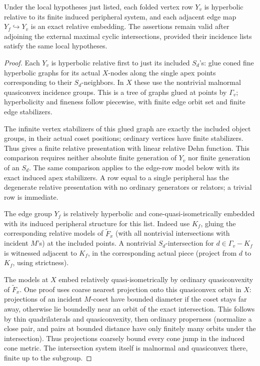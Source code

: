 \begin{lemma}\label{transfer:relative-rows}
Under the local hypotheses just listed, each folded vertex row \(Y_v\) is hyperbolic relative to its finite induced peripheral system, and each adjacent edge map \(Y_f\hookrightarrow Y_v\) is an exact relative embedding. The assertions remain valid after adjoining the external maximal cyclic intersections, provided their incidence lists satisfy the same local hypotheses.
\end{lemma}
\begin{proof}
Each \(Y_v\) is hyperbolic relative first to just its included \(S_d\)'s: glue coned fine hyperbolic graphs for its actual \(X\)-nodes along the single apex points corresponding to their \(S_d\)-neighbors. In \(X\) these use the nontrivial malnormal quasiconvex incidence groups. This is a tree of graphs glued at points by \(\Gamma_v\); hyperbolicity and fineness follow piecewise, with finite edge orbit set and finite edge stabilizers.

The infinite vertex stabilizers of this glued graph are exactly the
included object groups, in their actual coset positions; ordinary
vertices have finite stabilizers. Thus
\cite[Proposition~3.47]{GerasimovPotyagailo2015} gives a finite relative
presentation with linear relative Dehn function. This comparison
requires neither absolute finite generation of $Y_v$ nor finite
generation of an $S_d$. The same comparison applies to the edge-row
model below with its exact induced apex stabilizers. A row equal to
a single peripheral has the degenerate relative presentation with no
ordinary generators or relators; a trivial row is immediate.

The edge group \(Y_f\) is relatively hyperbolic and cone-quasi-isometrically embedded with its induced peripheral structure for this list. Indeed use \(K_f\), gluing the corresponding relative models of \(\widetilde F_x\) (with all nontrivial intersections with incident \(M\)'s) at the included points. A nontrivial \(S_d\)-intersection for \(d\in\Gamma_v-K_f\) is witnessed adjacent to \(K_f\), in the corresponding actual piece (project from \(d\) to \(K_f\), using strictness).

The models at \(X\) embed relatively quasi-isometrically by ordinary quasiconvexity of \(\widetilde F_x\). One proof uses coarse nearest projection onto this quasiconvex orbit in \(X\): projections of an incident \(M\)-coset have bounded diameter if the coset stays far away, otherwise lie boundedly near an orbit of the exact intersection. This follows by thin quadrilaterals and quasiconvexity, then ordinary properness (normalize a close pair, and pairs at bounded distance have only finitely many orbits under the intersection). Thus projections coarsely bound every cone jump in the induced cone metric. The intersection system itself is malnormal and quasiconvex there, finite up to the subgroup.


\end{proof}
